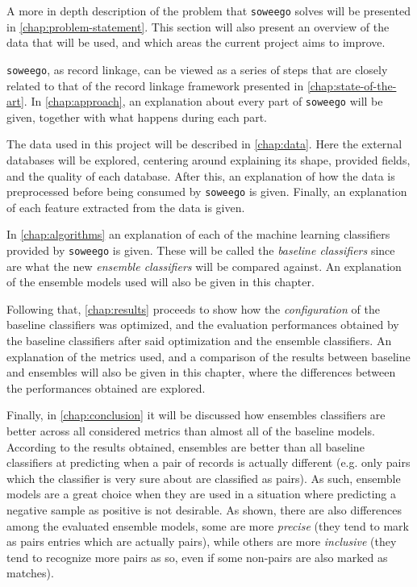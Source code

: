 \documentclass[epsfig,a4paper,11pt,titlepage,twoside,openany]{book}
\newcommand{\soweego}[0]{\texttt{soweego}\xspace}
\begin{document}
A more in depth description of the problem that \soweego solves will be presented in \autoref{chap:problem-statement}. This section will also present an overview of the data that will be used, and which areas the current project aims to improve.

\soweego, as record linkage, can be viewed as a series of steps that are closely related to that of the record linkage framework presented in \autoref{chap:state-of-the-art}. In \autoref{chap:approach}, an explanation about every part of \soweego will be given, together with what happens during each part. 

The data used in this project will be described in \autoref{chap:data}. Here the external databases will be explored, centering around explaining its shape, provided fields, and the quality of each database. After this, an explanation of how the data is preprocessed before being consumed by \soweego is given. Finally, an explanation of each feature extracted from the data is given.

In \autoref{chap:algorithms} an explanation of each of the machine learning classifiers provided by \soweego is given. These will be called the \textit{baseline classifiers} since are what the new \textit{ensemble classifiers} will be compared against. An explanation of the ensemble models used will also be given in this chapter.

Following that, \autoref{chap:results} proceeds to show how the \textit{configuration} of the baseline classifiers was optimized, and the evaluation performances obtained by the baseline classifiers after said optimization and the ensemble classifiers. An explanation of the metrics used, and a comparison of the results between baseline and ensembles will also be given in this chapter, where the differences between the performances obtained are explored.

Finally, in \autoref{chap:conclusion} it will be discussed how ensembles classifiers are better across all considered metrics than almost all of the baseline models. According to the results obtained, ensembles are better than all baseline classifiers at predicting when a pair of records is actually different (e.g. only pairs which the classifier is very sure about are classified as pairs). As such, ensemble models are a great choice when they are used in a situation where predicting a negative sample as positive is not desirable. As shown, there are also differences among the evaluated ensemble models, some are more \textit{precise} (they tend to mark as pairs entries which are actually pairs), while others are more \textit{inclusive} (they tend to recognize more pairs as so, even if some non-pairs are also marked as matches). 
\end{document}
